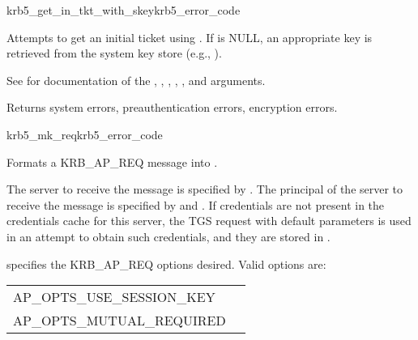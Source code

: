 \begin{funcdecl}{krb5_get_in_tkt_with_skey}{krb5_error_code}{\funcinout}
\funcin
{}
\funcinout
{}
\end{funcdecl}

Attempts to get an initial ticket using .  If
 is NULL, an appropriate key is retrieved from the
system key store (e.g., ).

See  for documentation of the
, , ,
, ,  and
 arguments.

Returns system errors, preauthentication errors, encryption errors.

\begin{funcdecl}{krb5_mk_req}{krb5_error_code}{\funcinout}
\funcin
{}
\funcinout
{}
\funcout
{}
\end{funcdecl}

Formats a KRB_AP_REQ message into .

The server to receive the message is specified by
. The principal of the server to receive the message
is specified by  and .
If credentials are not present in the credentials cache
 for this server, the TGS request with default
parameters is used in an attempt to obtain such credentials, and they
are stored in .

 specifies the KRB_AP_REQ options desired.
Valid options are:

\begin{tabular}{ll}
AP_OPTS_USE_SESSION_KEY&\\
AP_OPTS_MUTUAL_REQUIRED&\\
\end{tabular}
\label{ap-req-options}

